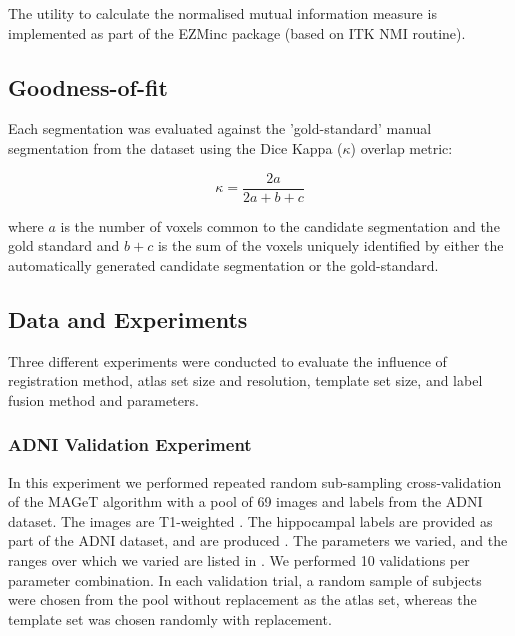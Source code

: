 \documentclass{article}\usepackage{graphicx, color}
\newcommand{\marginnote}[1]{\-\marginpar[\raggedleft\footnotesize #1]{\raggedright\footnotesize #1}}
\newcommand{\todo}[1]{\marginnote{\textcolor{red}{TODO #1}}}
\begin{document}
The utility to calculate the normalised mutual information measure is
implemented as part of the EZMinc package (based on ITK NMI routine).

\subsection{Goodness-of-fit}

Each segmentation was evaluated against the 'gold-standard' manual segmentation
from the dataset using the Dice Kappa ($\kappa$) overlap metric:

\begin{equation*} 
\kappa=\frac{2a}{2a+b+c}
\end{equation*}

where $a$ is the number of voxels common to the candidate segmentation and the
gold standard and $b+c$ is the sum of the voxels uniquely identified by either
the automatically generated candidate segmentation or the gold-standard.
\todo{I would do this after you define the experiments}

\subsection{Data and Experiments}

Three different experiments were conducted to evaluate the influence of
registration method, atlas set size and resolution, template set size, and
label fusion method and parameters.

\subsubsection{ADNI Validation Experiment}

In this experiment we performed repeated random sub-sampling cross-validation
of the MAGeT algorithm with a pool of 69 images and labels from the ADNI
dataset.  The images are T1-weighted \todo{<insert description of scan/machine
types>}.  The hippocampal labels are provided as part of the ADNI dataset, and
are produced \todo{<insert description of SNT labellings>}.  The parameters we
varied, and the ranges over which we varied are listed in \todo{table}.  We
performed 10 validations per parameter combination.  In each validation trial,
a random sample of subjects were chosen from the pool without replacement as
the atlas set, whereas the template set was chosen randomly with replacement.   
\end{document}
